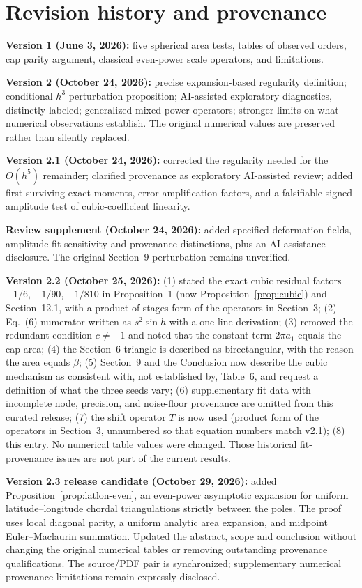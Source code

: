 \documentclass[11pt]{article}
\theoremstyle{remark}
\begin{document}
\section{Revision history and provenance}
\textbf{Version 1 (June 3, 2026):} five spherical area tests, tables of observed orders, cap
parity argument, classical even-power scale operators, and limitations.

\textbf{Version 2 (October 24, 2026):} precise expansion-based regularity definition;
conditional $h^3$ perturbation proposition; AI-assisted exploratory diagnostics, distinctly
labeled; generalized mixed-power operators; stronger limits on what numerical observations
establish. The original numerical values are preserved rather than silently replaced.

\textbf{Version 2.1 (October 24, 2026):} corrected the regularity needed for the $O(h^5)$
remainder; clarified provenance as exploratory AI-assisted review; added first surviving exact
moments, error amplification factors, and a falsifiable signed-amplitude test of
cubic-coefficient linearity.

\textbf{Review supplement (October 24, 2026):} added specified deformation fields,
amplitude-fit sensitivity and provenance distinctions, plus an AI-assistance disclosure. The
original Section~9 perturbation remains unverified.

\textbf{Version 2.2 (October 25, 2026):} (1) stated the exact cubic residual factors
$-1/6$, $-1/90$, $-1/810$ in Proposition~1 (now Proposition~\ref{prop:cubic}) and Section~12.1, with a product-of-stages form of
the operators in Section~3; (2) Eq.~(6) numerator written as $s^2\sin h$ with a one-line
derivation; (3) removed the redundant condition $c\neq-1$ and noted that the constant term
$2\pi a_1$ equals the cap area; (4) the Section~6 triangle is described as birectangular, with
the reason the area equals $\beta$; (5) Section~9 and the Conclusion now describe the cubic
mechanism as consistent with, not established by, Table~6, and request a definition of what the
three seeds vary; (6) supplementary fit data with incomplete node, precision, and noise-floor provenance are omitted from this curated release;
(7) the shift operator $T$ is now used (product form of the operators in Section~3, unnumbered so that equation numbers match v2.1); (8) this entry. No numerical table values
were changed. Those historical fit-provenance issues are not part of the current results.

\textbf{Version 2.3 release candidate (October 29, 2026):} added
Proposition~\ref{prop:latlon-even}, an even-power asymptotic expansion for uniform
latitude--longitude chordal triangulations strictly between the poles. The
proof uses local diagonal parity, a uniform analytic area expansion, and
midpoint Euler--Maclaurin summation. Updated the abstract, scope and conclusion
without changing the original numerical tables or removing outstanding
provenance qualifications. The source/PDF pair is synchronized; supplementary numerical provenance limitations remain expressly disclosed.
\end{document}
